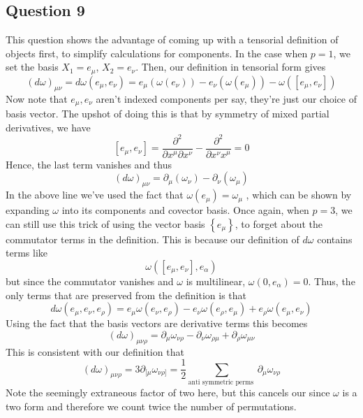 \documentclass[11pt, a4paper]{article}   	%
\theoremstyle{slplain}
\begin{document}
\subsection{Question 9}
This question shows the advantage of coming up with a 
tensorial definition of objects first, to simplify calculations for
components. In the case when $ p = 1 $, we set the basis  $ X_1 = e_\mu$, $ X_2 = e_\nu$. 
Then, our definition in tensorial form gives 
\[
	( d\omega ) _{ \mu \nu } = d\omega( e_\mu, e_\nu ) =  e_\mu ( \omega ( e_\nu ) ) - e_\nu ( \omega ( e_\mu ) ) - \omega ( [ e_\mu, e_\nu ] ) 
\] Now note that $ e_\mu , e_\nu $ aren't indexed components per say, 
they're just our choice of basis vector. 
The upshot of doing this is that by symmetry of mixed partial derivatives, 
we have 
\[
 [ e_\mu , e_ \nu ] = \frac{\partial^ 2 }{\partial x^ \mu \partial x^ \nu } - \frac{\partial ^ 2 }{\partial  x^ \nu x ^ \mu }  = 0  
\] Hence, the last term vanishes and thus 
\[
	( d \omega)_{ \mu \nu } = \partial _ \mu ( \omega_ \nu ) - \partial  _ \nu ( \omega _ \mu ) 
\] In the above line we've used the fact that
$ \omega ( e _ \mu ) = \omega_ \mu $ , which can be shown by expanding $ \omega  $ into 
its components and covector basis. 
Once again, when $ p = 3 $, we can still use this trick of using
 the vector basis  $ \left\{  e_\mu  \right\}$, to forget about the 
 commutator terms in the definition. This is because our definition of $ d \omega $ contains terms like 
  \[
	  \omega ( [ e_\mu , e_ \nu ] , e _ \alpha ) 
  \] but since the commutator vanishes and $ \omega $ is multilinear, $ \omega ( 0 , e_ \alpha ) = 0 $. 
  Thus, the only terms that are preserved from 
  the definition is that 
   \[
   d\omega ( e_\mu , e_ \nu , e_ \rho ) = e _ \mu \omega ( e_ \nu , e _ \rho ) - e _ \nu \omega( e _ \rho , e_ \mu ) + e_ \rho \omega ( e_ \mu , e_ \nu ) 
  \] Using the fact that the basis vectors are derivative terms this becomes
  \[
   ( d \omega)_{ \mu \nu \rho } = \partial _ \mu \omega_{ \nu \rho } - \partial _ \nu \omega _{ \rho \mu } + \partial  _ \rho \omega_{ \mu \nu } 
  \] This is consistent with our definition that 
  \[
	  ( d\omega ) _{ \mu \nu \rho } = 3 \partial  _{ [ \mu } \omega_{ \nu \rho ] } = \frac{1}{2 } \sum_{ \text{anti symmetric perms }} \partial _ \mu \omega_{ \nu \rho }
  \] Note the seemingly extraneous factor of two here, but this cancels our since 
  $ \omega $ is a two form and therefore we count twice the number of permutations. 
\end{document}
